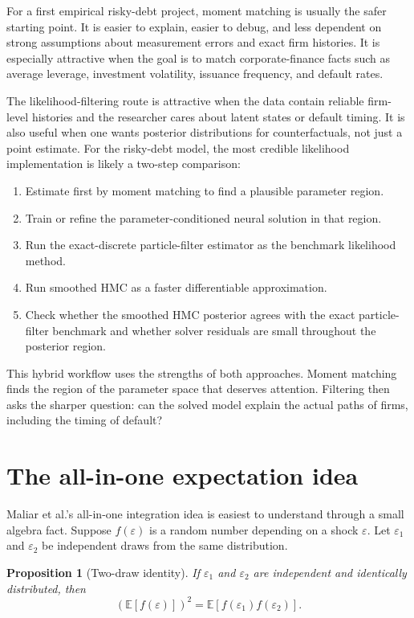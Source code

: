 \documentclass[11pt]{article}
\newtheorem{proposition}{Proposition}
\newcommand{\E}{\mathbb{E}}
\newcommand{\1}{\mathbf{1}}
\begin{document}
For a first empirical risky-debt project, moment matching is usually the safer
starting point. It is easier to explain, easier to debug, and less dependent on
strong assumptions about measurement errors and exact firm histories. It is
especially attractive when the goal is to match corporate-finance facts such as
average leverage, investment volatility, issuance frequency, and default rates.

The likelihood-filtering route is attractive when the data contain reliable
firm-level histories and the researcher cares about latent states or default
timing. It is also useful when one wants posterior distributions for
counterfactuals, not just a point estimate. For the risky-debt model, the most
credible likelihood implementation is likely a two-step comparison:

\begin{enumerate}[leftmargin=2em]
  \item Estimate first by moment matching to find a plausible parameter region.
  \item Train or refine the parameter-conditioned neural solution in that
  region.
  \item Run the exact-discrete particle-filter estimator as the benchmark
  likelihood method.
  \item Run smoothed HMC as a faster differentiable approximation.
  \item Check whether the smoothed HMC posterior agrees with the exact
  particle-filter benchmark and whether solver residuals are small throughout
  the posterior region.
\end{enumerate}

This hybrid workflow uses the strengths of both approaches. Moment matching
finds the region of the parameter space that deserves attention. Filtering
then asks the sharper question: can the solved model explain the actual paths
of firms, including the timing of default?

\section{The all-in-one expectation idea}

Maliar et al.'s all-in-one integration idea is easiest to understand through a
small algebra fact. Suppose \(f(\varepsilon)\) is a random number depending on a
shock \(\varepsilon\). Let \(\varepsilon_1\) and \(\varepsilon_2\) be independent
draws from the same distribution.

\begin{proposition}[Two-draw identity]
\label{prop:aio-identity}
If \(\varepsilon_1\) and \(\varepsilon_2\) are independent and identically
distributed, then
\begin{equation}
  \left(\E[f(\varepsilon)]\right)^2
  =
  \E[f(\varepsilon_1)f(\varepsilon_2)].
  \label{eq:aio-identity}
\end{equation}
\end{proposition}
\end{document}
